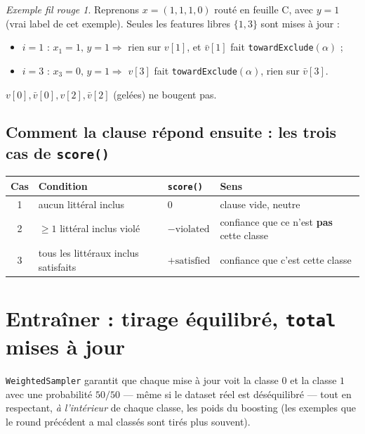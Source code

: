 \documentclass[12pt,a4paper]{article}
\newcommand{\vbar}{\bar{v}}
\newcommand{\code}[1]{\texttt{#1}}
\theoremstyle{remark}
\newtheorem{exemple}{Exemple fil rouge}[section]
\begin{document}
\begin{exemple}
Reprenons $x=(1,1,1,0)$ routé en feuille C, avec $y=1$ (vrai label de cet
exemple). Seules les features libres $\{1,3\}$ sont mises à jour :
\begin{itemize}
  \item $i=1$ : $x_1{=}1,\,y{=}1 \Rightarrow$ rien sur $v[1]$, et
        $\vbar[1]$ fait \code{towardExclude}$(\alpha)$ ;
  \item $i=3$ : $x_3{=}0,\,y{=}1 \Rightarrow$ $v[3]$ fait
        \code{towardExclude}$(\alpha)$, rien sur $\vbar[3]$.
\end{itemize}
$v[0],\vbar[0],v[2],\vbar[2]$ (gelées) ne bougent pas.
\end{exemple}

\subsection{Comment la clause répond ensuite : les trois cas de \code{score()}}\label{sec:update-sortie}

\begin{center}
\renewcommand{\arraystretch}{1.3}
\begin{tabular}{clll}
\toprule
Cas & Condition & \code{score()} & Sens \\
\midrule
1 & aucun littéral inclus & $0$ & clause vide, neutre \\
2 & $\ge1$ littéral inclus violé & $-\mathrm{violated}$ & confiance que ce n'est \textbf{pas} cette classe \\
3 & tous les littéraux inclus satisfaits & $+\mathrm{satisfied}$ & confiance que c'est cette classe \\
\bottomrule
\end{tabular}
\end{center}

\section{Entraîner : tirage équilibré, \code{total} mises à jour}\label{sec:sampler}

\code{WeightedSampler} garantit que chaque mise à jour voit la classe $0$ et la
classe $1$ avec une probabilité $50/50$ --- même si le dataset réel est
déséquilibré --- tout en respectant, \emph{à l'intérieur} de chaque classe, les
poids du boosting (les exemples que le round précédent a mal classés sont tirés
plus souvent).
\end{document}
